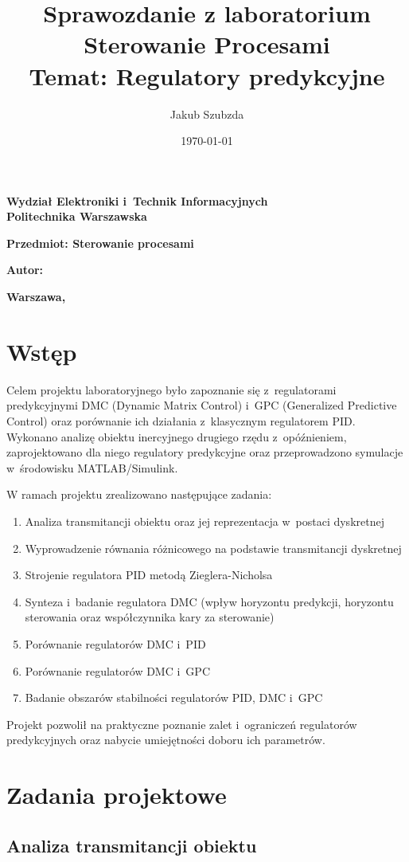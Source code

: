 \documentclass[a4paper,titlepage,11pt,floatssmall]{mwrep}
\title{\bf Sprawozdanie z laboratorium \\ Sterowanie Procesami \\ Temat: Regulatory predykcyjne}
\author{Jakub Szubzda}
\date{\today}
\makeatletter
\renewcommand{\maketitle}{\begin{titlepage}
\begin{center}{\LARGE {\bf
Wydział Elektroniki i~Technik Informacyjnych}}\\
\vspace{0.4cm}
{\LARGE {\bf Politechnika Warszawska}}\\
\vspace{0.3cm}
\end{center}
\vspace{5cm}
\begin{center}
{\bf \LARGE Przedmiot: Sterowanie procesami \vskip 0.1cm}
\end{center}
\vspace{1cm}
\begin{center}
{\bf \LARGE \@title \vskip 0.1cm}
\end{center}
\vspace{2cm}
\begin{center}
{\bf \Large Autor: \@author \par}
\end{center}
\vspace*{\stretch{6}}
\begin{center}
\bf{\large{Warszawa, \@date\vskip 0.1cm}}
\end{center}
\end{titlepage}
}
\makeatother
\begin{document}
\frenchspacing
\pagestyle{uheadings}

\maketitle

\tableofcontents

\chapter{Wstęp}

Celem projektu laboratoryjnego było zapoznanie się z~regulatorami predykcyjnymi DMC (Dynamic Matrix Control) i~GPC (Generalized Predictive Control) oraz porównanie ich działania z~klasycznym regulatorem PID. Wykonano analizę obiektu inercyjnego drugiego rzędu z~opóźnieniem, zaprojektowano dla niego regulatory predykcyjne oraz przeprowadzono symulacje w~środowisku MATLAB/Simulink.

W ramach projektu zrealizowano następujące zadania:
\begin{enumerate}
    \item Analiza transmitancji obiektu oraz jej reprezentacja w~postaci dyskretnej
    \item Wyprowadzenie równania różnicowego na podstawie transmitancji dyskretnej
    \item Strojenie regulatora PID metodą Zieglera-Nicholsa
    \item Synteza i~badanie regulatora DMC (wpływ horyzontu predykcji, horyzontu sterowania oraz współczynnika kary za sterowanie)
    \item Porównanie regulatorów DMC i~PID
    \item Porównanie regulatorów DMC i~GPC
    \item Badanie obszarów stabilności regulatorów PID, DMC i~GPC
\end{enumerate}

Projekt pozwolił na praktyczne poznanie zalet i~ograniczeń regulatorów predykcyjnych oraz nabycie umiejętności doboru ich parametrów.

\chapter{Zadania projektowe}

\section{Analiza transmitancji obiektu}
\end{document}
